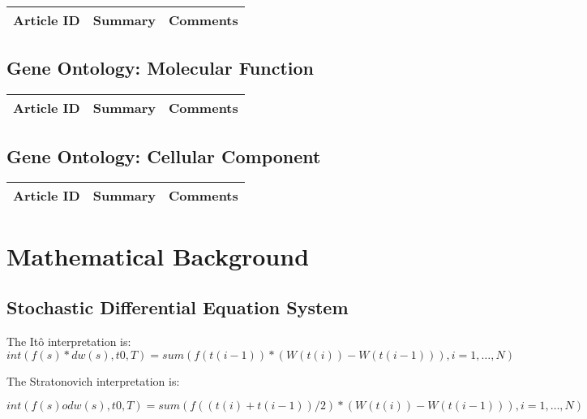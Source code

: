 \begin{table}[H]\centering
	\begin{tabular}{p{1cm}p{4cm}p{3cm}}
		Article ID & Summary & Comments\\
		\hline
		\hline
	\end{tabular}
\end{table}

\subsection{Gene Ontology: Molecular Function}

\begin{table}[H]\centering
	\begin{tabular}{p{1cm}p{4cm}p{3cm}}
		Article ID & Summary & Comments\\
		\hline
		\hline
	\end{tabular}
\end{table}

\subsection{Gene Ontology: Cellular Component}

\begin{table}[H]\centering
	\begin{tabular}{p{1cm}p{4cm}p{3cm}}
		Article ID & Summary & Comments\\
		\hline
		\hline
	\end{tabular}
\end{table}

\section{Mathematical Background}

\subsection{Stochastic Differential Equation System}

The Itô interpretation is:
\begin{equation}
int(f(s)*dw(s),t0,T) = sum(f(t(i-1)) * (W(t(i)) - W(t(i-1))),i=1,…,N)
\end{equation}

The Stratonovich interpretation is:

\begin{equation}
int(f(s) o dw(s),t0,T) = sum(f((t(i)+t(i-1))/2) * (W(t(i)) - W(t(i-1))),i=1,…,N)
\end{equation}

